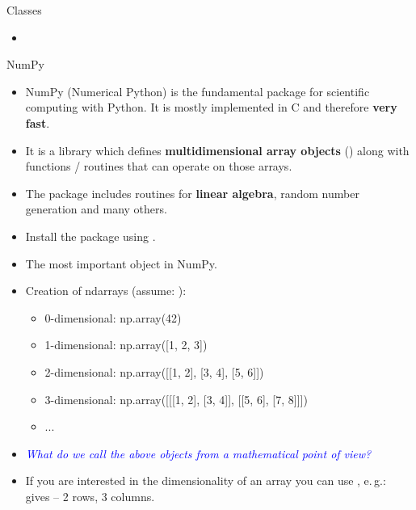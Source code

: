 
\begin{dwHeaderFrame}{Classes}
	\begin{itemize}
		\item
	\end{itemize}
\end{dwHeaderFrame}



\begin{dwHeaderFrame}{NumPy}
	\begin{itemize}
		\item NumPy (Numerical Python) is the fundamental package for scientific computing with Python.
			It is mostly implemented in C and therefore \textbf{very fast}.
		\item It is a library which defines \textbf{multidimensional array objects} () along with functions / routines
			that can operate on those arrays.
		\item The package includes routines for \textbf{linear algebra}, random number generation and many others.
		\item Install the package using .
	\end{itemize}
\end{dwHeaderFrame}


\begin{frame}
	\begin{itemize}
		\item The most important object in NumPy.
		\item Creation of ndarrays (assume: ):
		\begin{itemize}
			\item 0-dimensional: np.array(42)
			\item 1-dimensional: np.array([1, 2, 3])
			\item 2-dimensional: np.array([[1, 2], [3, 4], [5, 6]])
			\item 3-dimensional: np.array([[[1, 2], [3, 4]], [[5, 6], [7, 8]]])
			\item ...
		\end{itemize}
		\item \textcolor{blue}{\textit{What do we call the above objects from a mathematical point of view?}}
		\item If you are interested in the dimensionality of an array you can use , e.\,g.: \\
			 gives  -- 2 rows, 3 columns.
	\end{itemize}
\end{frame}


